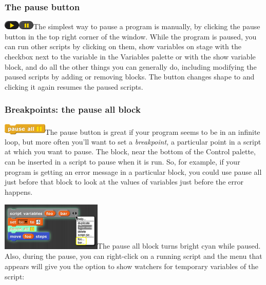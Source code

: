 \subsubsection{The pause button}\label{the-pause-button}

\includegraphics[width=0.29167in,height=0.16667in]{media/image115.png}\includegraphics[width=0.29167in,height=0.16667in]{media/image116.png}The
simplest way to pause a program is manually, by clicking the pause
button in the top right corner of the window. While the program is
paused, you can run other scripts by clicking on them, show variables on
stage with the checkbox next to the variable in the Variables palette or
with the show variable block, and do all the other things you can
generally do, including modifying the paused scripts by adding or
removing blocks. The button changes shape to and clicking it again
resumes the paused scripts.

\subsubsection{Breakpoints: the pause all
block}\label{breakpoints-the-pause-all-block}

\label{pause_all}{}\includegraphics[width=0.81944in,height=0.21528in]{media/image117.png}The
pause button is great if your program seems to be in an infinite loop,
but more often you'll want to set a \emph{breakpoint,} a particular
point in a script at which you want to pause. The block, near the bottom
of the Control palette, can be inserted in a script to pause when it is
run. So, for example, if your program is getting an error message in a
particular block, you could use pause all just before that block to look
at the values of variables just before the error happens.

\includegraphics[width=1.88333in,height=0.91111in]{media/image118.png}The
pause all block turns bright cyan while paused. Also, during the pause,
you can right-click on a running script and the menu that appears will
give you the option to show watchers for temporary variables of the
script:


